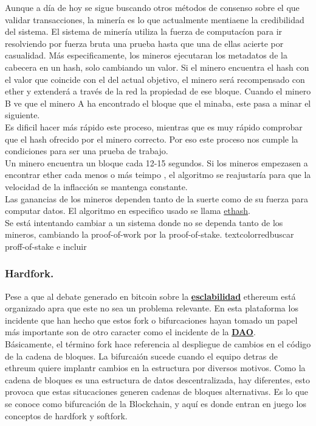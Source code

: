 \documentclass[11pt,a4paper]{article}
\begin{document}
Aunque a día de hoy se sigue buscando otros métodos de consenso sobre el que validar transacciones, la minería es lo que actualmente mentiaene la credibilidad del sistema. El sistema de minería utiliza la fuerza de computacíon para ir resolviendo por fuerza bruta una prueba hasta que una de ellas acierte por casualidad. Más especificamente, los mineros ejecutaran los metadatos de la cabecera en un hash, solo cambiando un valor. Si el minero encuentra el hash con el valor que coincide con el del actual objetivo, el minero será recompensado con ether y extenderá a través de la red la propiedad de ese bloque. Cuando el minero B ve que el minero A ha encontrado el bloque que el minaba, este pasa a minar el siguiente.\\

Es dificil hacer más rápido este proceso, mientras que es muy rápido comprobar que el hash ofrecido por el minero correcto. Por eso este proceso nos cumple la condiciones para ser una prueba de trabajo.\\

Un minero encuentra un bloque cada 12-15 segundos. Si los mineros empezasen a encontrar ether cada menos o más teimpo , el algoritmo se reajustaría para que la velocidad de la inflacción se mantenga constante.\\

Las ganancias de los mineros dependen tanto de la suerte como de su fuerza para computar datos. El algoritmo en especifico usado se llama \underline{ethash}. \\

Se está intentando cambiar a un sistema donde no se dependa tanto de los mineros, cambiando la proof-of-work por la proof-of-stake.
textcolor{red}{buscar proff-of-stake e incluir}\\

\subsubsection{Hardfork.}
Pese a que al debate generado en bitcoin sobre la \hyperref[sec:escalabilidad]{\textbf{\underline{esclabilidad}}} ethereum está organizado apra que este no sea un problema relevante. En esta plataforma los incidente que han hecho que estos fork o bifurcaciones hayan tomado un papel más importante son de otro caracter como el incidente de la \hyperref[sec:dao]{\textbf{\underline{DAO}}}.\\

Básicamente, el término fork hace referencia al despliegue de cambios en el código de la cadena de bloques. La bifurcaión sucede cuando el equipo detras de ethreum quiere implantr cambios en la estructura por diversos motivos. Como la cadena de bloques es una estructura de datos descentralizada, hay diferentes, esto provoca que estas situcaciones generen cadenas de bloques alternativas. Es lo que se conoce como bifurcación de la Blockchain, y aquí es donde entran en juego los conceptos de hardfork y softfork.\\
\end{document}
